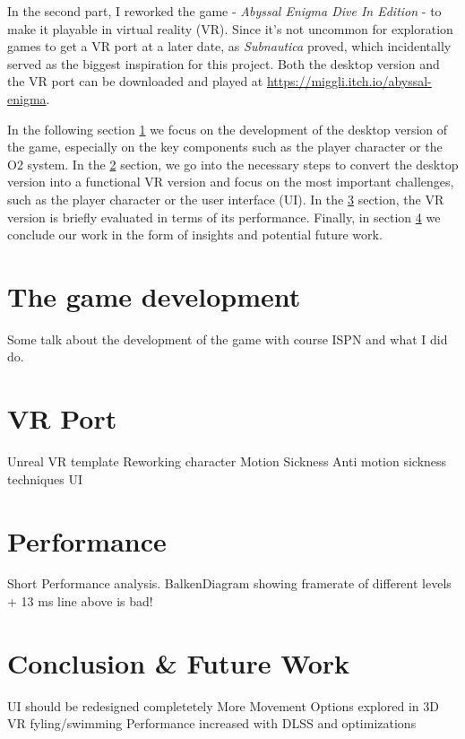 \documentclass[letterpaper, 10 pt, conference]{ieeeconf}  %
\begin{document}
In the second part, I  reworked the game - \textit{Abyssal Enigma Dive In Edition} - to make it playable in virtual reality (VR).
Since it's not uncommon for exploration games to get a VR port at a later date, as \textit{Subnautica} \cite{Subnautica} proved, 
which incidentally served as the biggest inspiration for this project.
Both the desktop version and the VR port can be downloaded and played at
\url{https://miggli.itch.io/abyssal-enigma}.

In the following section \ref{Sec:Game} we focus on the development of the desktop version of the game, 
especially on the key components such as the player character or the O2 system.
In the \ref{Sec:VR} section, we go into the necessary steps to convert the desktop version into a functional VR version 
and focus on the most important challenges, such as the player character or the user interface (UI).
In the \ref{Sec:Performance} section, the VR version is briefly evaluated in terms of its performance.
Finally, in section \ref{Sec:ConcFuture} we conclude our work in the form of insights and potential future work.

\section{The game development}
\label{Sec:Game}
Some talk about the development of the game with course ISPN and what I did do.

\section{VR Port}
\label{Sec:VR}

Unreal VR template
Reworking character
Motion Sickness
Anti motion sickness techniques
UI

\section{Performance}
\label{Sec:Performance}

Short Performance analysis.
BalkenDiagram showing framerate of different levels + 13 ms line above is bad!

\section{Conclusion \& Future Work}
\label{Sec:ConcFuture}

UI should be redesigned completetely
More Movement Options explored in 3D VR fyling/swimming
Performance increased with DLSS and optimizations
\end{document}
